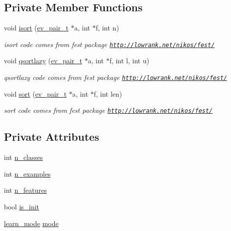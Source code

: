 \subsection*{Private Member Functions}
\begin{DoxyCompactItemize}
\item 
void \hyperlink{classdataset_a0a5e275e95d935b8d864b35e2dfd3933}{isort} (\hyperlink{structev__pair__t}{ev\+\_\+pair\+\_\+t} $\ast$a, int $\ast$f, int n)
\begin{DoxyCompactList}\small\item\em isort code comes from {\ttfamily fest package} \href{http://lowrank.net/nikos/fest/}{\tt http\+://lowrank.\+net/nikos/fest/} \end{DoxyCompactList}\item 
void \hyperlink{classdataset_a8008be7b546cc9ec90005557ad0ee289}{qsortlazy} (\hyperlink{structev__pair__t}{ev\+\_\+pair\+\_\+t} $\ast$a, int $\ast$f, int l, int u)
\begin{DoxyCompactList}\small\item\em qsortlazy code comes from {\ttfamily fest package} \href{http://lowrank.net/nikos/fest/}{\tt http\+://lowrank.\+net/nikos/fest/} \end{DoxyCompactList}\item 
void \hyperlink{classdataset_a8d1c382f82b2365674a87de56dae9ac1}{sort} (\hyperlink{structev__pair__t}{ev\+\_\+pair\+\_\+t} $\ast$a, int $\ast$f, int len)
\begin{DoxyCompactList}\small\item\em sort code comes from {\ttfamily fest package} \href{http://lowrank.net/nikos/fest/}{\tt http\+://lowrank.\+net/nikos/fest/} \end{DoxyCompactList}\end{DoxyCompactItemize}
\subsection*{Private Attributes}
\begin{DoxyCompactItemize}
\item 
int \hyperlink{classdataset_aa33a77fd21cbed4019bfb5ed82e30c6b}{n\+\_\+classes}
\item 
int \hyperlink{classdataset_ad7186a7fc9e74633c3b3fcddcf241ad4}{n\+\_\+examples}
\item 
int \hyperlink{classdataset_a5469ac8f1b5d64d836821e5056599b54}{n\+\_\+features}
\item 
bool \hyperlink{classdataset_ab5381427833c91ee35913ca1c1d4e73b}{is\+\_\+init}
\item 
\hyperlink{dataset_8h_a87dfee910993320c6720931fb701cc41}{learn\+\_\+mode} \hyperlink{classdataset_a47d44ca9cd02a4dc98ff80e0616a5aa9}{mode}
\end{DoxyCompactItemize}


